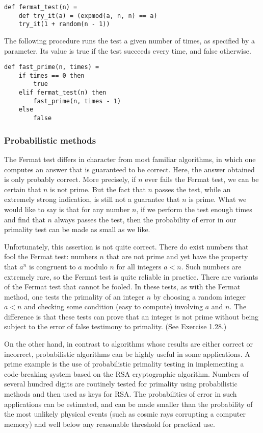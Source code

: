 \begin{lstlisting}
def fermat_test(n) =
    def try_it(a) = (expmod(a, n, n) == a)
    try_it(1 + random(n - 1))
\end{lstlisting}

The following procedure runs the test a given number of times, as specified by a parameter. Its value is true if the test succeeds every time, and false otherwise.

\begin{lstlisting}
def fast_prime(n, times) =
    if times == 0 then
        true
    elif fermat_test(n) then
        fast_prime(n, times - 1)
    else
        false
\end{lstlisting}

\subsubsection{Probabilistic methods}

The Fermat test differs in character from most familiar algorithms, in which one computes an answer that is guaranteed to be correct. Here, the answer obtained is only probably correct. More precisely, if $n$ ever fails the Fermat test, we can be certain that $n$ is not prime. But the fact that $n$ passes the test, while an extremely strong indication, is still not a guarantee that $n$ is prime. What we would like to say is that for any number $n$, if we perform the test enough times and find that $n$ always passes the test, then the probability of error in our primality test can be made as small as we like.

Unfortunately, this assertion is not quite correct. There do exist numbers that fool the Fermat test: numbers $n$ that are not prime and yet have the property that $a^n$ is congruent to $a$ modulo $n$ for all integers $a < n$. Such numbers are extremely rare, so the Fermat test is quite reliable in practice. There are variants of the Fermat test that cannot be fooled. In these tests, as with the Fermat method, one tests the primality of an integer $n$ by choosing a random integer $a < n$ and checking some condition (easy to compute) involving $a$ and $n$. The difference is that these tests can prove that an integer is not prime without being subject to the error of false testimony to primality. (See Exercise 1.28.)

On the other hand, in contrast to algorithms whose results are either correct or incorrect, probabilistic algorithms can be highly useful in some applications. A prime example is the use of probabilistic primality testing in implementing a code-breaking system based on the RSA cryptographic algorithm. Numbers of several hundred digits are routinely tested for primality using probabilistic methods and then used as keys for RSA. The probabilities of error in such applications can be estimated, and can be made smaller than the probability of the most unlikely physical events (such as cosmic rays corrupting a computer memory) and well below any reasonable threshold for practical use.

